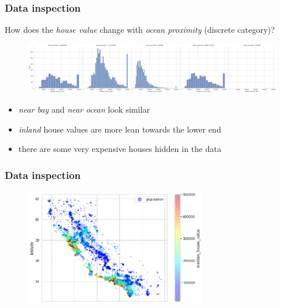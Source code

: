 \documentclass[aspectratio=169]{beamer}
\begin{document}
	\begin{frame}
		\frametitle{Data inspection}
		How does the \textit{house value} change with \textit{ocean proximity} (discrete category)?
		\begin{figure}
			\includegraphics[width=\textwidth]{./../plots/house_value_ocean.png}
		\end{figure}
		\begin{itemize}
			\item \textit{near bay} and \textit{near ocean} look similar
			\item \textit{inland} house values are more lean towards the lower end
			\item there are some very expensive houses hidden in the data
		\end{itemize}
	\end{frame}
	
		\begin{frame}
		\frametitle{Data inspection}
		\begin{figure}
			\includegraphics[width=0.7\textwidth]{./../plots/heatmap.png}
		\end{figure}
	\end{frame}
	
\end{document}
